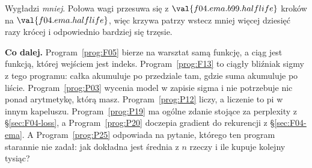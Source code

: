 \begin{fr}
\begin{ansblock}
Wygładzi \emph{mniej}. Połowa wagi przesuwa się z
$\val{f04.ema.b99.halflife}$ kroków na $\val{f04.ema.halflife}$, więc krzywa
patrzy wstecz mniej więcej dziesięć razy krócej i odpowiednio bardziej się
trzęsie.
\end{ansblock}

\medskip
\noindent
\textbf{Co dalej.} Program~\ref{prog:F05} bierze na warsztat samą funkcję, a
ciąg jest funkcją, której wejściem jest indeks. Program~\ref{prog:F13} to
ciągły bliźniak sigmy z tego programu: całka akumuluje po przedziale tam,
gdzie suma akumuluje po liście. Program~\ref{prog:P03} wycenia model w zapisie
sigma i nie potrzebuje nic ponad arytmetykę, którą masz.
Program~\ref{prog:P12} liczy, a liczenie to pi w innym kapeluszu.
Program~\ref{prog:P19} ma ogólne zdanie stojące za perplexity z
\S\ref{sec:F04-loss}, a Program~\ref{prog:P20} doczepia gradient do rekurencji
z \S\ref{sec:F04-ema}. A Program~\ref{prog:P25} odpowiada na pytanie, którego
ten program starannie nie zadał: jak dokładna jest średnia z $n$ rzeczy i ile
kupuje kolejny tysiąc?
\end{fr}

